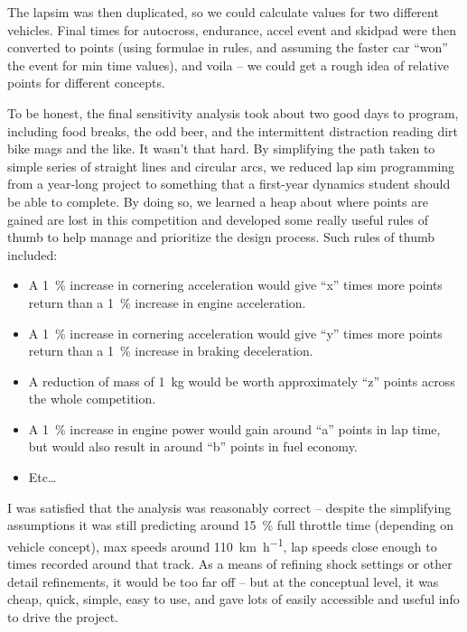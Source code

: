 \documentclass[10pt, a4paper, article, oneside, twocolumn, final]{memoir}
\begin{document}
The lapsim was then duplicated, so we could calculate values for two different vehicles. Final times for autocross, endurance, accel event and skidpad were then converted to points (using formulae in rules, and assuming the faster car “won” the event for min time values), and voila -- we could get a rough idea of relative points for different concepts. 

To be honest, the final sensitivity analysis took about two good days to program, including food breaks, the odd beer, and the intermittent distraction reading dirt bike mags and the like. It wasn’t that hard. By simplifying the path taken to simple series of straight lines and circular arcs, we reduced lap sim programming from a year-long project to something that a first-year dynamics student should be able to complete. By doing so, we learned a heap about where points are gained are lost in this competition and developed some really useful rules of thumb to help manage and prioritize the design process. Such rules of thumb included: 

\begin{itemize}
    \item A \SI{1}{\percent} increase in cornering acceleration would give “x” times more points return than a \SI{1}{\percent} increase in engine acceleration.
    \item A \SI{1}{\percent} increase in cornering acceleration would give “y” times more points return than a \SI{1}{\percent} increase in braking deceleration. 
    \item A reduction of mass of \SI{1}{\kilogram} would be worth approximately “z” points across the whole competition. 
    \item A \SI{1}{\percent} increase in engine power would gain around “a” points in lap time, but would also result in around “b” points in fuel economy.
    \item Etc\ldots
\end{itemize}

I was satisfied that the analysis was reasonably correct -- despite the simplifying assumptions it was still predicting around \SI{15}{\percent} full throttle time (depending on vehicle concept), max speeds around \SI{110}{\kilo\metre\per\hour}, lap speeds close enough to times recorded around that track. As a means of refining shock settings or other detail refinements, it would be too far off -- but at the conceptual level, it was cheap, quick, simple, easy to use, and gave lots of easily accessible and useful info to drive the project. 
\end{document}
